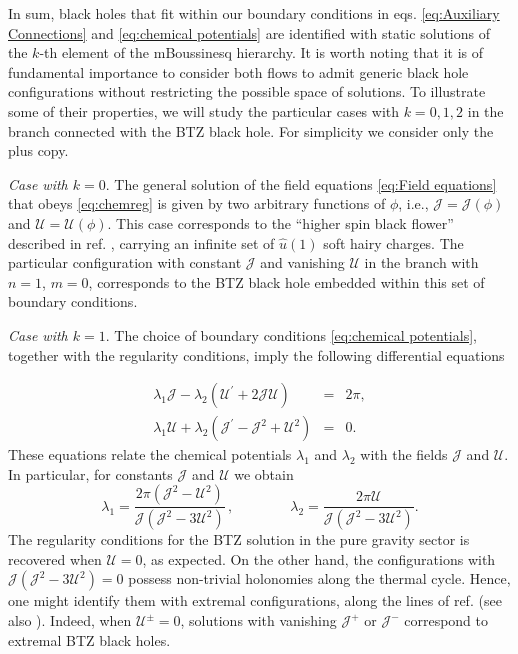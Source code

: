 \documentclass[letterpaper,11pt,oneside]{book}
\begin{document}
In sum, black holes that fit within our boundary conditions in eqs.
\eqref{eq:Auxiliary Connections} and \eqref{eq:chemical potentials}
are identified with static solutions of the $k$-th element of the
mBoussinesq hierarchy. It is worth noting that it is of fundamental
importance to consider both flows to admit generic black hole configurations
without restricting the possible space of solutions. To illustrate
some of their properties, we will study the particular cases with
$k=0,1,2$ in the branch connected with the BTZ black hole. For simplicity
we consider only the plus copy.

\emph{Case with $k=0$}. The general solution of the field equations
\eqref{eq:Field equations} that obeys \eqref{eq:chemreg} is given
by two arbitrary functions of $\phi$, i.e., $\mathcal{J}=\mathcal{J}\left(\phi\right)$
and $\mathcal{U}=\mathcal{U}\left(\phi\right)$. This case corresponds
to the ``higher spin black flower'' described in ref. \cite{Grumiller:2016kcp},
carrying an infinite set of $\hat{u}\left(1\right)$ soft hairy charges.
The particular configuration with constant $\mathcal{J}$ and vanishing
$\mathcal{U}$ in the branch with $n=1$, $m=0$, corresponds to the
BTZ black hole embedded within this set of boundary conditions.

\emph{Case with $k=1$}. The choice of boundary conditions \eqref{eq:chemical potentials},
together with the regularity conditions, imply the following differential
equations

\begin{eqnarray}
	\lambda_{1}\mathcal{J}-\lambda_{2}\left(\mathcal{U}^{\prime}+2\mathcal{J}\mathcal{U}\right) & = & 2\pi,\nonumber \\
	\lambda_{1}\mathcal{U}+\lambda_{2}\left(\mathcal{J}^{\prime}-\mathcal{J}^{2}+\mathcal{U}^{2}\right) & = & 0.\label{eq:systeq}
\end{eqnarray}
These equations relate the chemical potentials $\lambda_{1}$ and
$\lambda_{2}$ with the fields $\mathcal{J}$ and $\mathcal{U}$.
In particular, for constants $\mathcal{J}$ and $\mathcal{U}$ we
obtain
\begin{equation}
	\lambda_{1}=\frac{2\pi\left(\mathcal{J}^{2}-\mathcal{U}^{2}\right)}{\mathcal{J}\left(\mathcal{J}^{2}-3\mathcal{U}^{2}\right)}\,,\qquad\qquad\lambda_{2}=\frac{2\pi\mathcal{U}}{\mathcal{J}\left(\mathcal{J}^{2}-3\mathcal{U}^{2}\right)}.\label{eq:lambdak1}
\end{equation}
The regularity conditions for the BTZ solution in the pure gravity
sector is recovered when $\mathcal{U}=0$, as expected. On the other
hand, the configurations with $\mathcal{J}\left(\mathcal{J}^{2}-3\mathcal{U}^{2}\right)=0$
possess non-trivial holonomies along the thermal cycle. Hence, one
might identify them with extremal configurations, along the lines
of ref. \cite{Henneaux:2015ywa} (see also \cite{Banados:2015tft}).
Indeed, when $\mathcal{U}^{\pm}=0$, solutions with vanishing $\mathcal{J}^{+}$
or $\mathcal{J}^{-}$ correspond to extremal BTZ black holes.
\end{document}

